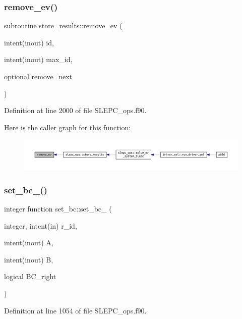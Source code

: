 \subsubsection{\texorpdfstring{remove\+\_\+ev()}{remove\_ev()}}
{\footnotesize\ttfamily subroutine store\+\_\+results\+::remove\+\_\+ev (\begin{DoxyParamCaption}\item[{intent(inout)}]{id,  }\item[{intent(inout)}]{max\+\_\+id,  }\item[{optional}]{remove\+\_\+next }\end{DoxyParamCaption})}



Definition at line 2000 of file S\+L\+E\+P\+C\+\_\+ops.\+f90.

Here is the caller graph for this function\+:
\nopagebreak
\begin{figure}[H]
\begin{center}
\leavevmode
\includegraphics[width=350pt]{SLEPC__ops_8f90_a3200b53f49d7eeb22c2625ac965f9f7c_icgraph}
\end{center}
\end{figure}
\mbox{\label{SLEPC__ops_8f90_abdaf8a38000d4b3d52de078affcd853d}} 
\subsubsection{\texorpdfstring{set\+\_\+bc\+\_()}{set\_bc\_1()}}
{\footnotesize\ttfamily integer function set\+\_\+bc\+::set\+\_\+bc\+\_ (\begin{DoxyParamCaption}\item[{integer, intent(in)}]{r\+\_\+id,  }\item[{intent(inout)}]{A,  }\item[{intent(inout)}]{B,  }\item[{logical}]{B\+C\+\_\+right }\end{DoxyParamCaption})}



Definition at line 1054 of file S\+L\+E\+P\+C\+\_\+ops.\+f90.

